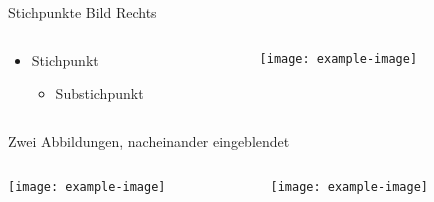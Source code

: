 \begin{frame}{Stichpunkte Bild Rechts}
    \begin{columns}
        \begin{column}{0.4\textwidth}
        \centering
            \begin{itemize}
                \item Stichpunkt
                \begin{itemize}
                    \item Substichpunkt
                \end{itemize}
            \end{itemize}
        \end{column}
        \begin{column}{0.6\textwidth}
            \texttt{[image: example-image]}
        \end{column}
    \end{columns}
\end{frame}


\begin{frame}{Zwei Abbildungen, nacheinander eingeblendet}
    \begin{columns}
        \begin{column}{0.5\textwidth}
            \texttt{[image: example-image]}
        \end{column}
        \pause
        \begin{column}{0.5\textwidth}
            \texttt{[image: example-image]}
        \end{column}
        
    \end{columns}
\end{frame}

